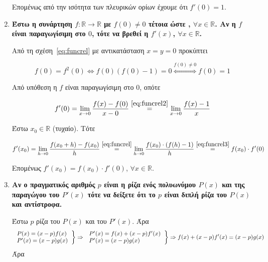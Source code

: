 \begin{enumerate}
		Επομένως από την ισότητα των πλευρικών ορίων έχουμε ότι $ f'(0) = 1 $.
		  
		
		

	\item {\bfseries \boldmath Έστω η συνάρτηση $ f \colon \mathbb{R} \to \mathbb{R} $ με $ f(0)
		\neq 0	$ τέτοια ώστε , $ \forall x \in \mathbb{R} $.
		Αν η $f$ είναι παραγωγίσιμη στο $0$, τότε να βρεθεί η $
	f'(x) $, $ \forall x \in \mathbb{R} $.}



		Από τη σχέση~\eqref{eq:funcrel} με αντικατάσταση $ x=y=0 $ προκύπτει
		
		\begin{equation}\label{eq:funcrel2}
			f(0) = f^{2}(0) \Leftrightarrow f(0)(f(0) - 1) = 0 \overset{f(0)\neq
			0}{\Leftrightarrow} f(0) = 1	
		\end{equation}

		Από υπόθεση η $f$ είναι παραγωγίσιμη στο 0, οπότε

		\begin{equation}\label{eq:funcrel3}
			f'(0) = \lim_{x\to 0} \frac{f(x) - f(0)}{x - 0}
			\overset{\eqref{eq:funcrel2}}{=} \lim_{x\to 0}
			\frac{f(x) - 1}{x} 	
		\end{equation}

		Έστω $ x_{0} \in \mathbb{R} $ (τυχαίο). Τότε

		\[
			f'(x_{0}) = \lim_{h\to 0} \frac{f(x_{0} + h) -
			f(x_{0})}{h}	\overset{\eqref{eq:funcrel}}{=} \lim_{h\to 0} \frac{f(x_{0})\cdot
		(f(h) - 1)}{h} \overset{\eqref{eq:funcrel3}}{=} f(x_{0})\cdot f'(0)
		\]

		Επομένως $ f'(x_{0}) = f(x_{0})\cdot f'(0)$, $ \forall x \in \mathbb{R}
		$.


	\item {\bfseries \boldmath Αν ο πραγματικός αριθμός $p$ είναι η ρίζα ενός πολυωνύμου $ P(x)
		$ και της παραγώγου του $ P'(x) $ τότε να δείξετε ότι το $p$ είναι διπλή
	ρίζα του $ P(x) $ και αντίστροφα.}

		

		Έστω $p$ ρίζα του $ P(x) $ και του $ P'(x) $. Άρα
		\[
			\left.
				\begin{tabular}{l}
			$P(x) = (x-p)f(x)$ \\
			$P'(x) = (x-p)g(x)$
				\end{tabular}
			\right\}\Rightarrow 
			\left.
				\begin{tabular}{l}
			$P'(x) = f(x) + (x-p)f'(x)$ \\
			$P'(x) = (x-p)g(x)$
				\end{tabular}
			\right\}\Rightarrow
			f(x) + (x-p)f'(x) = (x-p)g(x) 
			\]
			Άρα  


\end{enumerate}
